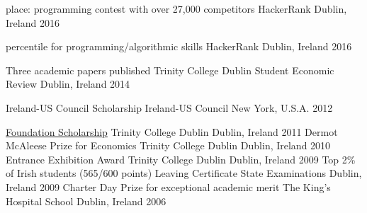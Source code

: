   
    \begin{cvhonors}
       
       \cvhonor
        { place: programming contest with over 27,000 competitors}
        {HackerRank}
        {Dublin, Ireland}
        {2016}
       
       \cvhonor
        { percentile for programming/algorithmic skills}
        {HackerRank}
        {Dublin, Ireland}
        {2016}
       
       \cvhonor
       {Three academic papers published}
       {Trinity College Dublin Student Economic Review}
       {Dublin, Ireland}
       {2014}

       
       \cvhonor
        {Ireland-US Council Scholarship}
        {Ireland-US Council}
        {New York, U.S.A.}
        {2012}
      
      \cvhonor
        {\href{https://en.wikipedia.org/wiki/Trinity_College,_Dublin\#Scholarship}{\textcolor{awesome-skyblue}{Foundation Scholarship}}}
        {Trinity College Dublin}
        {Dublin, Ireland}
        {2011}
      \cvhonor
        {Dermot McAleese Prize for Economics}
        {Trinity College Dublin}
        {Dublin, Ireland}
        {2010}
      \cvhonor
        {Entrance Exhibition Award}
        {Trinity College Dublin}
        {Dublin, Ireland}
        {2009}
    \cvhonor
        {Top 2\% of Irish students (565/600 points)}
        {Leaving Certificate State Examinations}
        {Dublin, Ireland}
        {2009}
      \cvhonor
        {Charter Day Prize for exceptional academic merit}
        {The King's Hospital School}
        {Dublin, Ireland}
        {2006}
    \end{cvhonors}

  


 
   